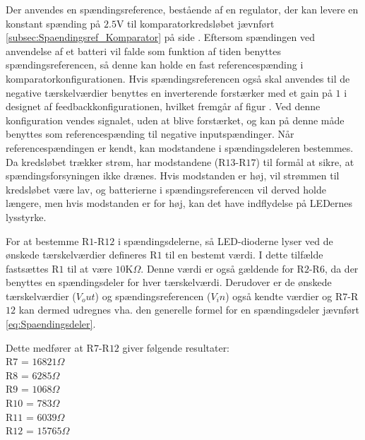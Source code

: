Der anvendes en spændingsreference, bestående af en regulator, der kan levere en konstant spænding på $2.5$V til komparatorkredsløbet jævnført \ref{subsec:Spaendingsref_Komparator} på side \pageref{subsec:Spaendingsref_Komparator}. Eftersom spændingen ved anvendelse af et batteri vil falde som funktion af tiden benyttes spændingsreferencen, så denne kan holde en fast referencespænding i komparatorkonfigurationen. Hvis spændingsreferencen også skal anvendes til de negative tærskelværdier benyttes en inverterende forstærker med et gain på $1$ i designet af feedbackkonfigurationen, hvilket fremgår af figur . Ved denne konfiguration vendes signalet, uden at blive forstærket, og kan på denne måde benyttes som referencespænding til negative inputspændinger. Når referencespændingen er kendt, kan modstandene i spændingsdeleren bestemmes. Da kredsløbet trækker strøm, har modstandene (R$13$-R$17$)  til formål at sikre, at spændingsforsyningen ikke drænes. Hvis modstanden er høj, vil strømmen til kredsløbet være lav, og batterierne i spændingsreferencen vil derved holde længere, men hvis modstanden er for høj, kan det have indflydelse på LEDernes lysstyrke. 

For at bestemme R$1$-R$12$ i spændingsdelerne, så LED-dioderne lyser ved de ønskede tærskelværdier defineres R$1$ til en bestemt værdi. I dette tilfælde fastsættes R$1$ til at være $10$K$\Omega$. Denne værdi er også gældende for R$2$-R$6$, da der benyttes en spændingsdeler for hver tærskelværdi. Derudover er de ønskede tærskelværdier ($V_out$) og spændingsreferencen ($V_in$) også kendte værdier og R$7$-R$12$ kan dermed udregnes vha. den generelle formel for en spændingsdeler jævnført \eqref{eq:Spaendingsdeler}. 


Dette medfører at R$7$-R$12$ giver følgende resultater:\\
R$7$ = $16821\Omega$ \\
R$8$ = $6285\Omega$ \\
R$9$ = $1068\Omega$ \\
R$10$ = $783\Omega$ \\
R$11$ = $6039\Omega$ \\
R$12$ = $15765\Omega$ \\

